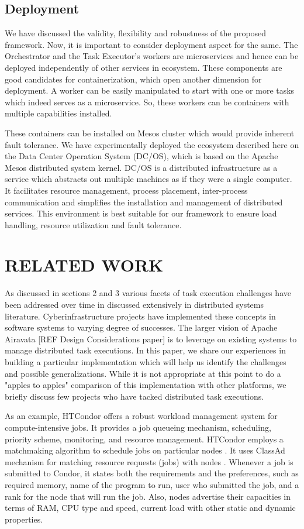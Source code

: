 \documentclass[review]{elsarticle}
\begin{document}
\subsection{Deployment}
We have discussed the validity, flexibility and robustness of the proposed framework. Now, it is important to consider deployment aspect for the same. The Orchestrator and the Task Executor's workers are microservices and hence can be deployed independently of other services in ecosystem. These components are good candidates for containerization, which open another dimension for deployment. A worker can be easily manipulated to start with one or more tasks which indeed serves as a microservice. So, these workers can be containers with multiple capabilities installed. 

These containers can be installed on Mesos cluster which would provide inherent fault tolerance. We have experimentally deployed the ecosystem described here on the Data Center Operation System (DC/OS), which is based on the Apache Mesos distributed system kernel. DC/OS is a distributed infrastructure as a service which abstracts out multiple machines as if they were a single computer. It facilitates resource management, process placement, inter-process communication and simplifies the installation and management of distributed services. This environment is best suitable for our framework to ensure load handling, resource utilization and fault tolerance.  


\section{RELATED WORK}

As discussed in sections 2 and 3 various facets of task execution challenges have been addressed over time in discussed extensively in distributed systems literature. Cyberinfrastructure projects have implemented these concepts in software systems to varying degree of successes. The larger vision of Apache Airavata [REF Design Considerations paper] is to leverage on existing systems to manage distributed task executions. In this paper, we share our experiences in building a particular implementation which will help us identify the challenges and possible generalizations. While it is not appropriate at this point to do a "apples to apples" comparison of this implementation with other platforms, we briefly discuss few projects who have tacked distributed task executions. 

As an example, HTCondor offers a robust workload management system for compute-intensive jobs. It provides a job queueing mechanism, scheduling, priority scheme, monitoring, and resource management. HTCondor employs a matchmaking algorithm to schedule jobs on particular nodes \cite{coleman2001implementation}. It uses ClassAd mechanism for matching resource requests (jobs) with nodes \cite{coleman2003distributed}. Whenever a job is submitted to Condor, it states both the requirements and the preferences, such as required memory, name of the program to run, user who submitted the job, and a rank for the node that will run the job. Also, nodes advertise their capacities in terms of RAM, CPU type and speed, current load with other static and dynamic properties.
\end{document}
